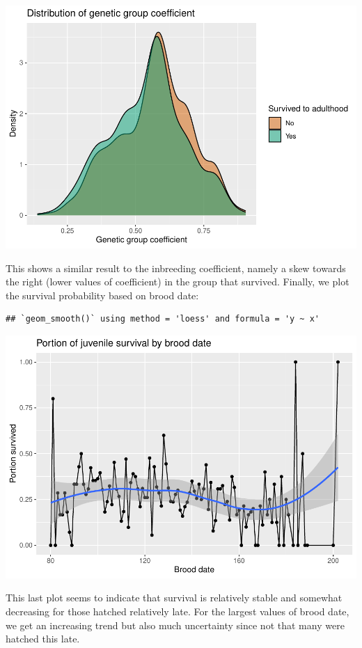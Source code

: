 \includegraphics{EDA_files/figure-latex/unnamed-chunk-10-1.pdf}

This shows a similar result to the inbreeding coefficient, namely a skew
towards the right (lower values of coefficient) in the group that
survived. Finally, we plot the survival probability based on brood date:

\begin{verbatim}
## `geom_smooth()` using method = 'loess' and formula = 'y ~ x'
\end{verbatim}

\includegraphics{EDA_files/figure-latex/unnamed-chunk-11-1.pdf}

This last plot seems to indicate that survival is relatively stable and
somewhat decreasing for those hatched relatively late. For the largest
values of brood date, we get an increasing trend but also much
uncertainty since not that many were hatched this late.